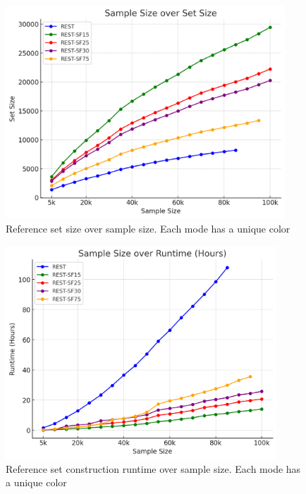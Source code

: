 \begin{figure}[ht]
    \begin{minipage}[b]{0.99\linewidth}
        \centering
        \includegraphics[height=8cm, keepaspectratio]{./figures/set_size.png}
        \caption{Reference set size over sample size. Each mode has a unique color}
        \label{fig:set_size}
    \end{minipage}
\end{figure}
\begin{figure}[h!]
    \begin{minipage}[b]{0.99\linewidth}
        \centering
        \includegraphics[height=8cm, keepaspectratio]{./figures/set_runtime.png}
        \caption{Reference set construction runtime over sample size. Each mode has a unique color}
        \label{fig:set_runtime}
    \end{minipage}
\end{figure}

